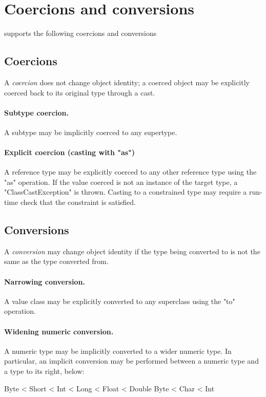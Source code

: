 \section{Coercions and conversions}
\label{XtenConversions}

\XtenCurrVer{} supports the following coercions and conversions

\subsection{Coercions}

A {\em coercion} does not change object identity;
a coerced object may be explicitly coerced back to its original
type through a cast.

\paragraph{Subtype coercion.}
A subtype may be implicitly coerced to any supertype.

\paragraph{Explicit coercion (casting with \xcd"as")}
A reference type may be explicitly coerced to any other
reference type using the \xcd"as" operation.
If the value coerced is not an instance of the target type,
a \xcd"ClassCastException" is thrown.  Casting to a constrained
type may require a run-time check that the constraint is
satisfied.

\subsection{Conversions}

A {\em conversion} may change object identity if the type being
converted to is not the same as the type converted from.

\paragraph{Narrowing conversion.}
A value class may be explicitly converted to any superclass
using the \xcd"to" operation.


\paragraph{Widening numeric conversion.}
A numeric type may be implicitly converted to a wider
numeric type.
In particular, an implicit conversion may be performed between
a numeric type and a type to its right, below:
\begin{xten}
Byte < Short < Int < Long < Float < Double
Byte < Char < Int
\end{xten}

